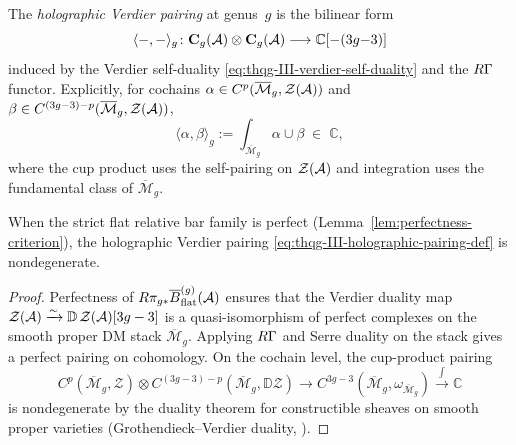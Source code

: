 \begin{definition}
\label{def:thqg-III-holographic-pairing}
The \emph{holographic Verdier pairing} at genus~$g$ is the
bilinear form
\begin{equation}\label{eq:thqg-III-holographic-pairing-def}
\langle -, - \rangle_g
\colon
\mathbf{C}_g(\mathcal{A}) \otimes \mathbf{C}_g(\mathcal{A})
\longrightarrow
\mathbb{C}[{-(3g{-}3)}]
\end{equation}
induced by the Verdier self-duality
\eqref{eq:thqg-III-verdier-self-duality} and the $R\Gamma$
functor. Explicitly, for cochains
$\alpha \in C^p(\overline{\mathcal{M}}_g, \mathcal{Z}(\mathcal{A}))$
and
$\beta \in C^{(3g-3)-p}(\overline{\mathcal{M}}_g,
\mathcal{Z}(\mathcal{A}))$,
\begin{equation}\label{eq:thqg-III-pairing-explicit}
\langle \alpha, \beta \rangle_g
:=
\int_{\overline{\mathcal{M}}_g}
\alpha \cup \beta
\;\in\; \mathbb{C},
\end{equation}
where the cup product uses the self-pairing on
$\mathcal{Z}(\mathcal{A})$ and integration uses the fundamental class
of $\overline{\mathcal{M}}_g$.
\end{definition}

\begin{lemma}
\label{lem:thqg-III-nondegeneracy}
When the strict flat relative bar family is perfect
\textup{(}Lemma~\textup{\ref{lem:perfectness-criterion})},
the holographic Verdier pairing
\eqref{eq:thqg-III-holographic-pairing-def} is nondegenerate.
\end{lemma}

\begin{proof}
Perfectness of $R\pi_{g*}\overline{B}^{(g)}_{\mathrm{flat}}(\mathcal{A})$ ensures that
the Verdier duality map
$\mathcal{Z}(\mathcal{A}) \xrightarrow{\sim}
\mathbb{D}\,\mathcal{Z}(\mathcal{A})[3g - 3]$
is a quasi-isomorphism of perfect complexes on the smooth
proper DM stack $\overline{\mathcal{M}}_g$. Applying $R\Gamma$
and Serre duality on the stack gives a perfect pairing on
cohomology. On the cochain level, the cup-product pairing
\[
C^p(\overline{\mathcal{M}}_g, \mathcal{Z})
\otimes
C^{(3g-3)-p}(\overline{\mathcal{M}}_g, \mathbb{D}\mathcal{Z})
\to
C^{3g-3}(\overline{\mathcal{M}}_g, \omega_{\overline{\mathcal{M}}_g})
\xrightarrow{\int}
\mathbb{C}
\]
is nondegenerate by the duality theorem for constructible sheaves
on smooth proper varieties
(Grothendieck--Verdier duality, \cite[Theorem~3.1.10]{KS90}).
\end{proof}

